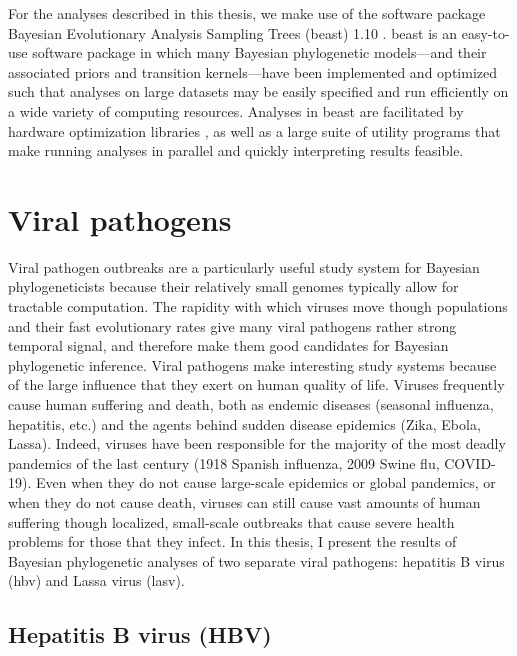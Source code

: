 For the analyses described in this thesis, we make use of the software package Bayesian Evolutionary Analysis Sampling Trees (\gls{beast}) 1.10 \cite{suchard2018bayesian}.
\gls{beast} is an easy-to-use software package in which many Bayesian phylogenetic models---and their associated priors and transition kernels---have been implemented and optimized such that analyses on large datasets may be easily specified and run efficiently on a wide variety of computing resources.
Analyses in \gls{beast} are facilitated by hardware optimization libraries \cite{ayres2019beagle}, as well as a large suite of utility programs that make running analyses in parallel and quickly interpreting results feasible.

\section{Viral pathogens}
Viral pathogen outbreaks are a particularly useful study system for Bayesian phylogeneticists because their relatively small genomes typically allow for tractable computation.
The rapidity with which viruses move though populations and their fast evolutionary rates give many viral pathogens rather strong temporal signal, and therefore make them good candidates for Bayesian phylogenetic inference.
Viral pathogens make interesting study systems because of the large influence that they exert on human quality of life.
Viruses frequently cause human suffering and death, both as endemic diseases (seasonal influenza, hepatitis, etc.) and the agents behind sudden disease epidemics (Zika, Ebola, Lassa).
Indeed, viruses have been responsible for the majority of the most deadly pandemics of the last century (1918 Spanish influenza, 2009 Swine flu, COVID-19).
Even when they do not cause large-scale epidemics or global pandemics, or when they do not cause death, viruses can still cause vast amounts of human suffering though localized, small-scale outbreaks that cause severe health problems for those that they infect.
In this thesis, I present the results of Bayesian phylogenetic analyses of two separate viral pathogens: hepatitis B virus (\gls{hbv}) and Lassa virus (\gls{lasv}).


\subsection{Hepatitis B virus (HBV)}

